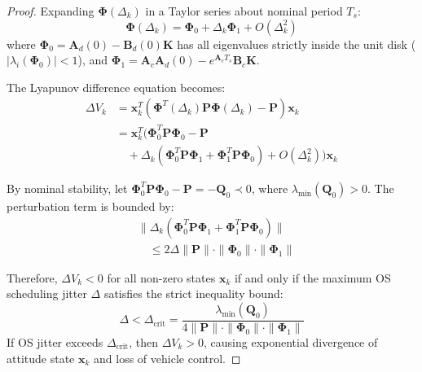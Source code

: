 \documentclass[10pt,journal,compsoc,twocolumn]{article}
\begin{document}
\begin{proof}
Expanding $\boldsymbol{\Phi}(\Delta_k)$ in a Taylor series about nominal period $T_s$:
\begin{equation}
\boldsymbol{\Phi}(\Delta_k) = \boldsymbol{\Phi}_0 + \Delta_k \boldsymbol{\Phi}_1 + O(\Delta_k^2)
\end{equation}
where $\boldsymbol{\Phi}_0 = \mathbf{A}_d(0) - \mathbf{B}_d(0)\mathbf{K}$ has all eigenvalues strictly inside the unit disk ($|\lambda_i(\boldsymbol{\Phi}_0)| < 1$), and $\boldsymbol{\Phi}_1 = \mathbf{A}_c \mathbf{A}_d(0) - e^{\mathbf{A}_c T_s} \mathbf{B}_c \mathbf{K}$.

The Lyapunov difference equation becomes:
\begin{equation}
\begin{aligned}
\Delta V_k &= \mathbf{x}_k^T \left( \boldsymbol{\Phi}^T(\Delta_k) \mathbf{P} \boldsymbol{\Phi}(\Delta_k) - \mathbf{P} \right) \mathbf{x}_k \\
&= \mathbf{x}_k^T \bigl( \boldsymbol{\Phi}_0^T \mathbf{P} \boldsymbol{\Phi}_0 - \mathbf{P} \\
&\quad + \Delta_k \left( \boldsymbol{\Phi}_0^T \mathbf{P} \boldsymbol{\Phi}_1 + \boldsymbol{\Phi}_1^T \mathbf{P} \boldsymbol{\Phi}_0 \right) + O(\Delta_k^2) \bigr) \mathbf{x}_k
\end{aligned}
\end{equation}

By nominal stability, let $\boldsymbol{\Phi}_0^T \mathbf{P} \boldsymbol{\Phi}_0 - \mathbf{P} = -\mathbf{Q}_0 \prec 0$, where $\lambda_{\min}(\mathbf{Q}_0) > 0$. The perturbation term is bounded by:
\begin{equation}
\begin{aligned}
&\|\Delta_k (\boldsymbol{\Phi}_0^T \mathbf{P} \boldsymbol{\Phi}_1 + \boldsymbol{\Phi}_1^T \mathbf{P} \boldsymbol{\Phi}_0)\| \\
&\quad \le 2\Delta \|\mathbf{P}\| \cdot \|\boldsymbol{\Phi}_0\| \cdot \|\boldsymbol{\Phi}_1\|
\end{aligned}
\end{equation}

Therefore, $\Delta V_k < 0$ for all non-zero states $\mathbf{x}_k$ if and only if the maximum OS scheduling jitter $\Delta$ satisfies the strict inequality bound:
\begin{equation}
\label{eq:jitter_bound}
\Delta < \Delta_{\text{crit}} = \frac{\lambda_{\min}(\mathbf{Q}_0)}{4 \|\mathbf{P}\| \cdot \|\boldsymbol{\Phi}_0\| \cdot \|\boldsymbol{\Phi}_1\|}
\end{equation}
If OS jitter exceeds $\Delta_{\text{crit}}$, then $\Delta V_k > 0$, causing exponential divergence of attitude state $\mathbf{x}_k$ and loss of vehicle control.
\end{proof}
\end{document}
